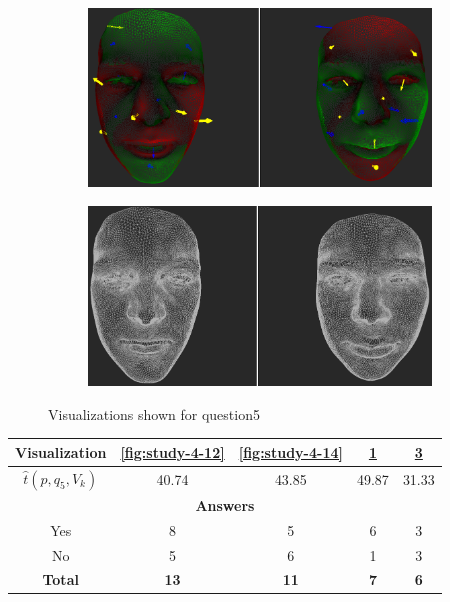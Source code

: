 \begin{figure}[h]
\begin{subfigure}{0.4\textwidth}
\includegraphics[width=\textwidth]{./screenshots/pair11.PNG}
\caption{}
\label{fig:study-4-11}
\end{subfigure}
\quad
\begin{subfigure}{0.4\textwidth}
\includegraphics[width=\textwidth]{./screenshots/pair13.PNG}
\caption{}
\label{fig:study-4-13}
\end{subfigure}
\caption{Visualizations shown for question5}
\end{figure}
\medskip

\begin{center}
\begin{tabular}{| c | c | c | c | c |}
	\hline
	Visualization & \ref{fig:study-4-12} & \ref{fig:study-4-14} & \ref{fig:study-4-11} & \ref{fig:study-4-13}\\ \hline
	\(\widehat{t}(p, q_5, V_k)\) & 40.74 & 43.85 & 49.87 & 31.33\\ \hline
	\multicolumn{5}{|c|}{\bf Answers} \\ \hline
	Yes & 8 & 5 & 6 & 3\\ \hline
	No & 5 & 6 & 1 & 3\\ \hline
	{\bf Total} & {\bf 13} & {\bf 11} & {\bf 7} & {\bf 6}\\ \hline
\end{tabular}
\end{center}
\clearpage

